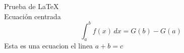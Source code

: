 \documentclass{article}
\begin{document}
	Prueba de \LaTeX\\
	Ecuación centrada
	\begin{equation}
		\int_a^b f(x)\,dx = G(b)-G(a)
	\end{equation}
	Esta es una ecuacion el linea \( a + b = c \)
\end{document}
